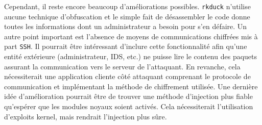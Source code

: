 \documentclass[12pt]{article}
\begin{document}
	Cependant, il reste encore beaucoup d'améliorations possibles. \texttt{rkduck} n'utilise aucune technique d'obfuscation et le simple fait de désassembler le code donne toutes les informations dont un administrateur a besoin pour s'en défaire. Un autre point important est l'absence de moyens de communications chiffrées mis à part \texttt{SSH}. Il pourrait être intéressant d'inclure cette fonctionnalité afin qu'une entité extérieure (administrateur, IDS, etc.) ne puisse lire le contenu des paquets assurant la communication vers le serveur de l'attaquant. En revanche, cela nécessiterait une application cliente côté attaquant comprenant le protocole de communication et implémentant la méthode de chiffrement utilisée. Une dernière idée d'amélioration pourrait être de trouver une méthode d'injection plus fiable qu'espérer que les modules noyaux soient activés. Cela nécessiterait l'utilisation d'exploits kernel, mais rendrait l'injection plus sûre.
\newpage
\end{document}
